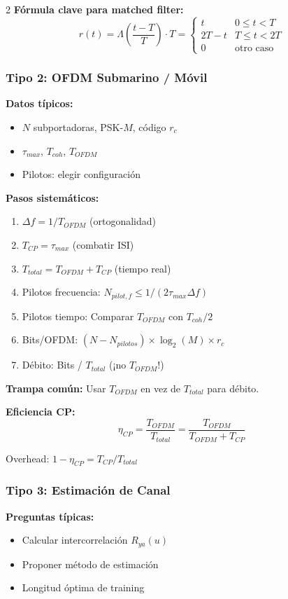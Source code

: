 \documentclass[10pt,a4paper]{article}
\begin{document}
\begin{multicols}{2}
\textbf{Fórmula clave para matched filter:}
$$r(t) = \Lambda\left(\frac{t-T}{T}\right) \cdot T = \begin{cases}
t & 0 \leq t < T\\
2T-t & T \leq t < 2T\\
0 & \text{otro caso}
\end{cases}$$

\subsubsection{Tipo 2: OFDM Submarino / Móvil}

\textbf{Datos típicos:}
\begin{itemize}
\item $N$ subportadoras, PSK-$M$, código $r_c$
\item $\tau_{max}$, $T_{coh}$, $T_{OFDM}$
\item Pilotos: elegir configuración
\end{itemize}

\textbf{Pasos sistemáticos:}
\begin{enumerate}
\item $\Delta f = 1/T_{OFDM}$ (ortogonalidad)
\item $T_{CP} = \tau_{max}$ (combatir ISI)
\item $T_{total} = T_{OFDM} + T_{CP}$ (tiempo real)
\item Pilotos frecuencia: $N_{pilot,f} \leq 1/(2\tau_{max}\Delta f)$
\item Pilotos tiempo: Comparar $T_{OFDM}$ con $T_{coh}/2$
\item Bits/OFDM: $(N - N_{pilotos}) \times \log_2(M) \times r_c$
\item Débito: Bits / $T_{total}$ (¡no $T_{OFDM}$!)
\end{enumerate}

\textbf{Trampa común:} Usar $T_{OFDM}$ en vez de $T_{total}$ para débito.

\textbf{Eficiencia CP:}
$$\eta_{CP} = \frac{T_{OFDM}}{T_{total}} = \frac{T_{OFDM}}{T_{OFDM}+T_{CP}}$$

Overhead: $1 - \eta_{CP} = T_{CP}/T_{total}$

\subsubsection{Tipo 3: Estimación de Canal}

\textbf{Preguntas típicas:}
\begin{itemize}
\item Calcular intercorrelación $R_{ya}(u)$
\item Proponer método de estimación
\item Longitud óptima de training
\end{itemize}


\end{multicols}
\end{document}
